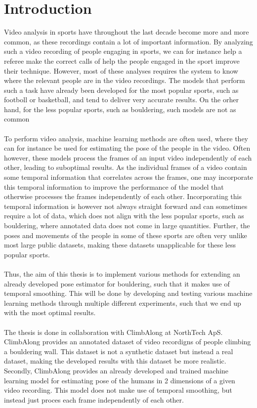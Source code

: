 \documentclass[./main.tex]{subfiles}
\begin{document}
\section{Introduction}
Video analysis in sports have throughout the last decade become more and more common, as these recordings contain a lot of important information. By analyzing such a video recording of people engaging in sports, we can for instance help a referee make the correct calls of help the people engaged in the sport improve their technique. However, most of these analyses requires the system to know where the relevant people are in the video recordings. The models that perform such a task have already been developed for the most popular sports, such as footboll or basketball, and tend to deliver very accurate results. On the orher hand, for the less popular sports, such as bouldering, such models are not as common
\\
\\
To perform video analysis, machine learning methods are often used, where they can for instance be used for estimating the pose of the people in the video. Often however, these models process the frames of an input video independently of each other, leading to suboptimal results. As the individual frames of a video contain some temporal information that correlates across the frames, one may incorporate this temporal information to improve the performance of the model that otherwise processes the frames independently of each other. Incorporating this temporal information is however not always straight forward and can sometimes require a lot of data, which does not align with the less popular sports, such as bouldering, where annotated data does not come in large quantities. Further, the poses and movements of the people in some of these sports are often very unlike most large public datasets, making these datasets unapplicable for these less popular sports.
\\
\\
Thus, the aim of this thesis is to implement various methods for extending an already developed pose estimator for bouldering, such that it makes use of temporal smoothing. This will be done by developing and testing various machine learning methods through multiple different experiments, such that we end up with the most optimal results.
\\
\\
The thesis is done in collaboration with ClimbAlong at NorthTech ApS. ClimbAlong provides an annotated dataset of video recordigns of people climbing a bouldering wall. This dataset is not a synthetic dataset but instead a real dataset, making the developed results with this dataset be more realistic. Secondly, ClimbAlong provides an already developed and trained machine learning model for estimating pose of the humans in 2 dimensions of a given video recording. This model does not make use of temporal smoothing, but instead just proces each frame independently of each other.
\end{document}
